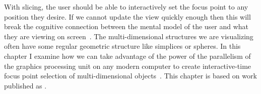 
With slicing, the user should be able to interactively set the focus point to
any position they desire. If we cannot update the view quickly enough then this
will break the cognitive connection between the mental model of the user and
what they are viewing on screen~\cite{Shneiderman:1987}. The multi-dimensional
structures we are visualizing often have some regular geometric structure like
simplices or spheres.  In this chapter I examine how we can take advantage of
the power of the parallelism of the graphics processing unit on any modern
computer to create interactive-time focus point selection of multi-dimensional
objects~\cite{Torsney-Weir:2017}.
This chapter is based on work published as .











